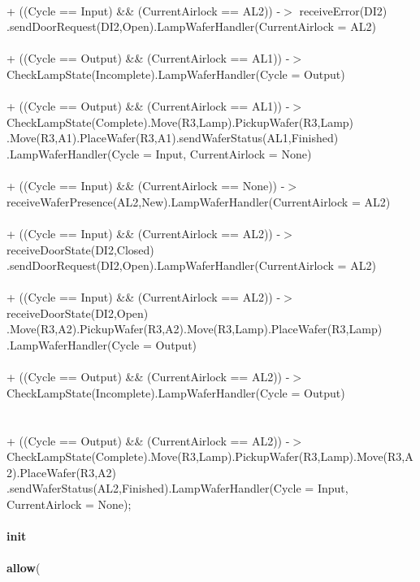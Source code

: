 \documentclass[a4paper,12pt]{article}
\begin{document}
	\\ + ((Cycle == Input) \&\& (CurrentAirlock == AL2)) -$>$ receiveError(DI2)
	\\.sendDoorRequest(DI2,Open).LampWaferHandler(CurrentAirlock = AL2)
	\\
	\\+ ((Cycle == Output) \&\& (CurrentAirlock == AL1)) -$>$ CheckLampState(Incomplete).LampWaferHandler(Cycle = Output)
	\\
	\\+ ((Cycle == Output) \&\& (CurrentAirlock == AL1)) -$>$ CheckLampState(Complete).Move(R3,Lamp).PickupWafer(R3,Lamp)
	\\.Move(R3,A1).PlaceWafer(R3,A1).sendWaferStatus(AL1,Finished)
	\\.LampWaferHandler(Cycle = Input, CurrentAirlock = None)
	\\
	\\+ ((Cycle == Input) \&\& (CurrentAirlock == None)) -$>$ receiveWaferPresence(AL2,New).LampWaferHandler(CurrentAirlock = AL2)
	\\
	\\+ ((Cycle == Input) \&\& (CurrentAirlock == AL2)) -$>$ receiveDoorState(DI2,Closed)
	\\.sendDoorRequest(DI2,Open).LampWaferHandler(CurrentAirlock = AL2)
	\\
	\\+ ((Cycle == Input) \&\& (CurrentAirlock == AL2)) -$>$ receiveDoorState(DI2,Open)\\.Move(R3,A2).PickupWafer(R3,A2).Move(R3,Lamp).PlaceWafer(R3,Lamp)
	\\.LampWaferHandler(Cycle = Output)
	\\
	\\+ ((Cycle == Output) \&\& (CurrentAirlock == AL2)) -$>$ CheckLampState(Incomplete).LampWaferHandler(Cycle = Output)
	\\
	\\
	\\+ ((Cycle == Output) \&\& (CurrentAirlock == AL2)) -$>$ CheckLampState(Complete).Move(R3,Lamp).PickupWafer(R3,Lamp).Move(R3,A2).PlaceWafer(R3,A2)
	\\.sendWaferStatus(AL2,Finished).LampWaferHandler(Cycle = Input, CurrentAirlock = None);
	\\
	\\\textbf{init} 
	\\
	\\\textbf{			allow}(
\end{document}
